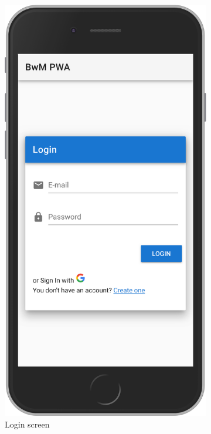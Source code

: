 \begin{figure}
  \centering
  \begin{subfigure}{.5\textwidth}
    \centering
    \includegraphics[width=.7\linewidth]{img/screen01}
    \caption{Login screen}
    \label{fig:sub1}
  \end{subfigure}%
  \begin{subfigure}{.5\textwidth}
    \centering

\end{subfigure}
\end{figure}
